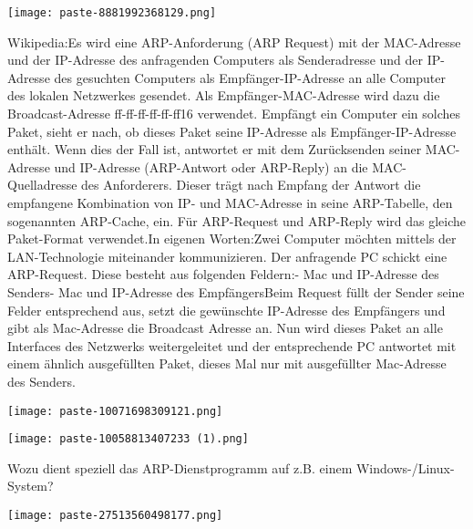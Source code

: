 \documentclass{article}
\begin{document}
\begin{tcolorbox}[colback=white!10!white,colframe=lightgray!75!black,
  savelowerto=\jobname_ex.tex,breakable,enhanced,lines before break=40]

\justifying
\begin{center}
\texttt{[image: paste-8881992368129.png]}
\end{center}


\tcblower

\justifying
Wikipedia:Es wird eine ARP-Anforderung (ARP Request) mit der MAC-Adresse und der IP-Adresse des anfragenden Computers als Senderadresse und der IP-Adresse des gesuchten Computers als Empfänger-IP-Adresse an alle Computer des lokalen Netzwerkes gesendet. Als Empfänger-MAC-Adresse wird dazu die Broadcast-Adresse ff-ff-ff-ff-ff-ff16 verwendet. Empfängt ein Computer ein solches Paket, sieht er nach, ob dieses Paket seine IP-Adresse als Empfänger-IP-Adresse enthält. Wenn dies der Fall ist, antwortet er mit dem Zurücksenden seiner MAC-Adresse und IP-Adresse (ARP-Antwort oder ARP-Reply) an die MAC-Quelladresse des Anforderers. Dieser trägt nach Empfang der Antwort die empfangene Kombination von IP- und MAC-Adresse in seine ARP-Tabelle, den sogenannten ARP-Cache, ein. Für ARP-Request und ARP-Reply wird das gleiche Paket-Format verwendet.In eigenen Worten:Zwei Computer möchten mittels der LAN-Technologie miteinander kommunizieren. Der anfragende PC schickt eine ARP-Request. Diese besteht aus folgenden Feldern:- Mac und IP-Adresse des Senders- Mac und IP-Adresse des EmpfängersBeim Request füllt der Sender seine Felder entsprechend aus, setzt die gewünschte IP-Adresse des Empfängers und gibt als Mac-Adresse die Broadcast Adresse an. Nun wird dieses Paket an alle Interfaces des Netzwerks weitergeleitet und der entsprechende PC antwortet mit einem ähnlich ausgefüllten Paket, dieses Mal nur mit ausgefüllter Mac-Adresse des Senders.\begin{center}
\texttt{[image: paste-10071698309121.png]}
\end{center}
\begin{center}
\texttt{[image: paste-10058813407233 (1).png]}
\end{center}

\end{tcolorbox}
\begin{tcolorbox}[colback=white!10!white,colframe=lightgray!75!black,
  savelowerto=\jobname_ex.tex,breakable,enhanced,lines before break=40]

\justifying
Wozu dient speziell das ARP-Dienstprogramm auf z.B. einem Windows-/Linux-System?

\tcblower

\justifying
\begin{center}
\texttt{[image: paste-27513560498177.png]}
\end{center}

\end{tcolorbox}
\end{document}

